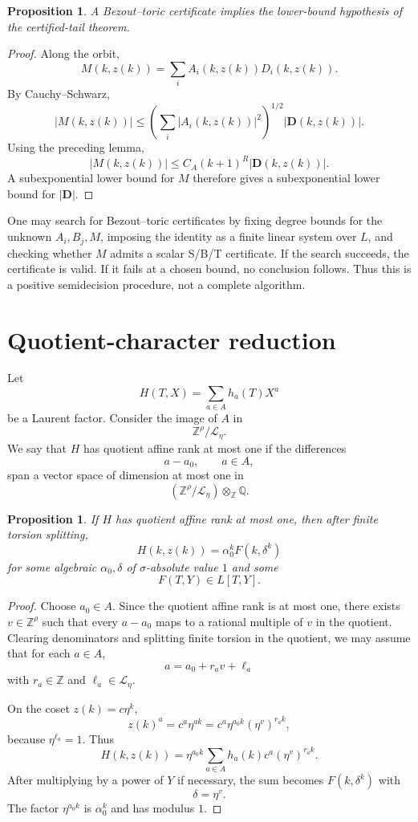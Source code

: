 \documentclass[11pt]{article}
\newtheorem{proposition}[theorem]{Proposition}
\newcommand{\Q}{\mathbb Q}
\newcommand{\Z}{\mathbb Z}
\begin{document}
\begin{proposition}
A Bezout--toric certificate implies the lower-bound hypothesis of the certified-tail theorem.
\end{proposition}

\begin{proof}
Along the orbit,
\[
M(k,z(k))=\sum_i A_i(k,z(k))D_i(k,z(k)).
\]
By Cauchy--Schwarz,
\[
|M(k,z(k))|
\le
\left(\sum_i|A_i(k,z(k))|^2\right)^{1/2}|\mathbf D(k,z(k))|.
\]
Using the preceding lemma,
\[
|M(k,z(k))|\le C_A(k+1)^R|\mathbf D(k,z(k))|.
\]
A subexponential lower bound for \(M\) therefore gives a subexponential lower bound for \(|\mathbf D|\).
\end{proof}

One may search for Bezout--toric certificates by fixing degree bounds for the unknown \(A_i,B_j,M\), imposing the identity as a finite linear system over \(L\), and checking whether \(M\) admits a scalar S/B/T certificate. If the search succeeds, the certificate is valid. If it fails at a chosen bound, no conclusion follows. Thus this is a positive semidecision procedure, not a complete algorithm.

\section{Quotient-character reduction}

Let
\[
H(T,X)=\sum_{a\in A}h_a(T)X^a
\]
be a Laurent factor. Consider the image of \(A\) in
\[
\Z^\rho/\mathcal L_\eta.
\]
We say that \(H\) has quotient affine rank at most one if the differences
\[
a-a_0,
\qquad
a\in A,
\]
span a vector space of dimension at most one in
\[
(\Z^\rho/\mathcal L_\eta)\otimes_\Z\Q.
\]

\begin{proposition}
If \(H\) has quotient affine rank at most one, then after finite torsion splitting,
\[
H(k,z(k))=\alpha_0^k F(k,\delta^k)
\]
for some algebraic \(\alpha_0,\delta\) of \(\sigma\)-absolute value \(1\) and some
\[
F(T,Y)\in L[T,Y].
\]
\end{proposition}

\begin{proof}
Choose \(a_0\in A\). Since the quotient affine rank is at most one, there exists \(v\in\Z^\rho\) such that every \(a-a_0\) maps to a rational multiple of \(v\) in the quotient. Clearing denominators and splitting finite torsion in the quotient, we may assume that for each \(a\in A\),
\[
a=a_0+r_av+\ell_a
\]
with \(r_a\in\Z\) and \(\ell_a\in\mathcal L_\eta\).

On the coset \(z(k)=c\eta^k\),
\[
z(k)^a
=
c^a\eta^{ak}
=
c^a\eta^{a_0k}(\eta^v)^{r_ak},
\]
because \(\eta^{\ell_a}=1\). Thus
\[
H(k,z(k))
=
\eta^{a_0k}\sum_{a\in A}h_a(k)c^a(\eta^v)^{r_ak}.
\]
After multiplying by a power of \(Y\) if necessary, the sum becomes \(F(k,\delta^k)\) with
\[
\delta=\eta^v.
\]
The factor \(\eta^{a_0k}\) is \(\alpha_0^k\) and has modulus \(1\).
\end{proof}
\end{document}
